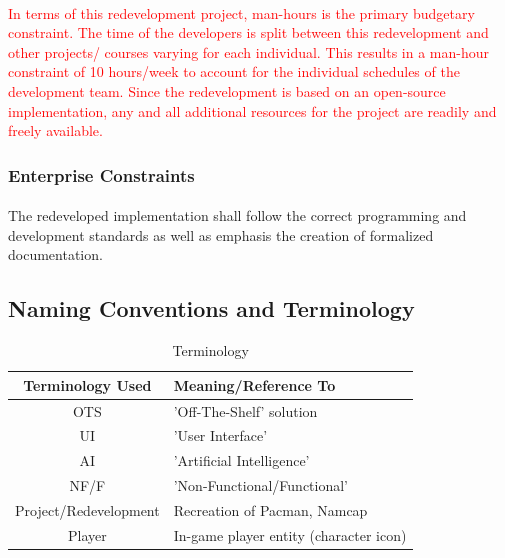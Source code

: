 \documentclass[12pt, titlepage]{article}
\begin{document}
\paragraph{}
\textcolor{red}{In terms of this redevelopment project, man-hours is the primary budgetary constraint. The time of the developers is split between this redevelopment and other projects/ courses varying for each individual. This results in a man-hour constraint of 10 hours/week to account for the individual schedules of the development team.  Since the redevelopment is based on an open-source implementation, any and all additional resources for the project are readily and freely available.}

\subsubsection{Enterprise Constraints}
\paragraph{}
The redeveloped implementation shall follow the correct programming and development standards as well as emphasis the creation of formalized documentation.

\subsection{Naming Conventions and Terminology}
\begin{table}[H]
\caption{Terminology} \label{tab:terms}
\begin{center}
\begin{tabular}{| c | l |}
\hline
\textbf{Terminology Used} & \textbf{Meaning/Reference To} \\ \hline
OTS & 'Off-The-Shelf' solution \\ \hline
UI & 'User Interface' \\ \hline
AI & 'Artificial Intelligence' \\ \hline
NF/F & 'Non-Functional/Functional' \\ \hline
Project/Redevelopment & Recreation of Pacman, Namcap \\ \hline
Player & In-game player entity (character icon)\\
\hline
\end{tabular}
\end{center}
\end{table}
\end{document}

